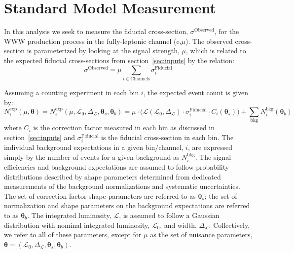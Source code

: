 

\section{Standard Model Measurement}
\label{sec:measurement}
\newcommand*\Diff[1]{\mathop{}\!\mathrm{d}#1~}
\newcommand{\boldtheta}{\boldsymbol{\theta}}
\newcommand{\thetas}{\boldsymbol{\theta}_s}
\newcommand{\thetab}{\boldsymbol{\theta}_b}
\newcommand{\curlyl}{\mathcal{L}}

In this analysis we seek to measure the 
fiducial cross-section, $\sigma^{\textrm{Observed}}$, for the 
WWW production process in the fully-leptonic channel (e,$\mu$).
The observed cross-section is parameterized by looking at the signal
strength, $\mu$, which is related to the expected fiducial cross-sections
from section~\ref{sec:inputs} by the relation:
\begin{equation}
\sigma^{\textrm{Observed}} = \mu \sum_{i\in \textrm{Channels}} \sigma^{\textrm{Fiducial}}_i
\end{equation}

Assuming a counting experiment in each bin $i$, the expected 
event count is given by:
\begin{equation}
N^{\mathrm{exp}}_i(\mu,\boldtheta) = N^{\mathrm{exp}}_i(\mu,\curlyl_0,\Delta_{\curlyl},\thetas,\thetab) = \mu \cdot \bigg( \curlyl(\curlyl_0,\Delta_{\curlyl}) \cdot \sigma^{\mathrm{Fiducial}}_i \cdot C_i(\thetas) \bigg) + \sum_{\mathrm{bkg}} N_{i}^{\mathrm{bkg}}(\thetab)
\label{eq:poisson_expectation}
\end{equation}
where $C_i$ is the correction factor 
measured in each bin as discussed in section~\ref{sec:inputs} and 
$\sigma^{\mathrm{Fiducial}}_i$ is the fiducial cross-section in each 
bin. The 
individual background expectations in a given bin/channel, $i$, are 
expressed simply by the number of events
for a given background as $N^{\mathrm{bkg}}_i$. 
The signal efficiencies and background expectations are assumed to follow 
probability distributions described by shape parameters determined from 
dedicated measurements of the background normalizations and systematic 
uncertainties.  
The set of correction factor shape parameters are referred to 
as $\thetas$; the set of normalization and shape parameters on 
the background expectations are referred to as $\thetab$.
The integrated luminosity, $\curlyl$, is assumed to follow 
a Gaussian distribution with nominal integrated 
luminosity, $\curlyl_0$, and width, $\Delta_{\curlyl}$. 
Collectively, we refer to all of these parameters, except 
for $\mu$ as the set of nuisance 
parameters, $\boldtheta = (\curlyl_0,\Delta_{\curlyl}, \thetas, \thetab)$. 

